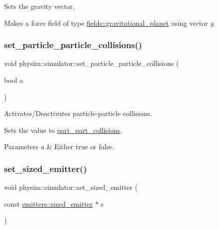 Sets the gravity vector. 

Makes a force field of type \hyperlink{classphysim_1_1fields_1_1gravitational__planet}{fields\+::gravitational\+\_\+planet} using vector {\itshape g}. \mbox{\label{classphysim_1_1simulator_a46208fce1548645f874618b44edde065}} 
\subsubsection{\texorpdfstring{set\+\_\+particle\+\_\+particle\+\_\+collisions()}{set\_particle\_particle\_collisions()}}
{\footnotesize\ttfamily void physim\+::simulator\+::set\+\_\+particle\+\_\+particle\+\_\+collisions (\begin{DoxyParamCaption}\item[{bool}]{a }\end{DoxyParamCaption})}



Activates/\+Deactivates particle-\/particle collisions. 

Sets the value to \hyperlink{classphysim_1_1simulator_a4a7d02feac1ca57bb143b70ad8b81134}{part\+\_\+part\+\_\+collisions}. 
\begin{DoxyParams}{Parameters}
{\em a} & Either true or false. \\
\hline
\end{DoxyParams}
\mbox{\label{classphysim_1_1simulator_a39882b752b51378a547bab344933c49e}} 
\subsubsection{\texorpdfstring{set\+\_\+sized\+\_\+emitter()}{set\_sized\_emitter()}}
{\footnotesize\ttfamily void physim\+::simulator\+::set\+\_\+sized\+\_\+emitter (\begin{DoxyParamCaption}\item[{const \hyperlink{classphysim_1_1emitters_1_1sized__emitter}{emitters\+::sized\+\_\+emitter} $\ast$}]{s }\end{DoxyParamCaption})}




